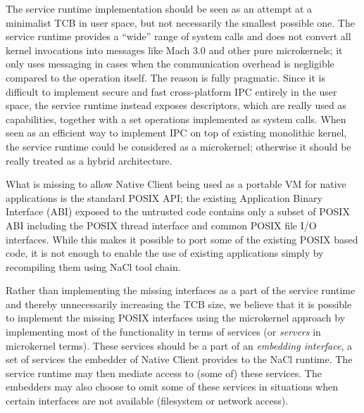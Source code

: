 The service runtime implementation  should be seen as an attempt at a
minimalist TCB in user space, but not necessarily the smallest possible
one. The service runtime provides a ``wide'' range of system calls and
does not convert all kernel invocations into messages like Mach 3.0 and
other pure microkernels; it only uses messaging in cases when the
communication overhead is negligible compared to the operation itself.
The reason is fully pragmatic. Since it is difficult to implement secure
and fast cross-platform IPC entirely in the user space, the service
runtime instead exposes descriptors, which are really used as
capabilities, together with a set operations implemented as system
calls. When seen as an efficient way to implement IPC on top of existing
monolithic kernel, the service runtime could be considered as a
microkernel; otherwise it should be really treated as a hybrid
architecture.


What is missing to allow Native Client being used as a portable VM for
native applications is the standard POSIX API; the existing Application
Binary Interface (ABI) exposed to the untrusted code contains only a
subset of POSIX ABI including the POSIX thread interface and common
POSIX file I/O interfaces. While this makes it possible to port some of
the existing POSIX based code, it is not enough to enable the use of
existing applications simply by recompiling them using NaCl tool chain.

Rather than implementing the missing interfaces as a part of the service
runtime and thereby unnecessarily increasing the TCB size, we believe
that it is possible to implement the missing POSIX interfaces using the
microkernel approach by implementing most of the functionality in terms of
services (or \emph{servers} in microkernel terms).  These services
should be a part of an \emph{embedding interface}, a set of services the
embedder of Native Client provides to the NaCl runtime. The service
runtime may then mediate access to (some of) these services. The
embedders may also choose to  omit some of these services in situations
when certain interfaces are not available (\eg filesystem or network
access).

